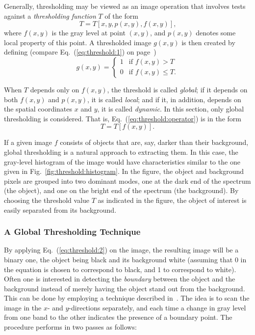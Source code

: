 Generally, thresholding may be viewed as an image operation that
involves tests against a {\em thresholding function\/} $T$ of the form
\begin{equation}
\label{eq:threshold:operator}
  T=T[x,y,p(x,y),f(x,y)]\mbox{,}
\end{equation}
where $f(x,y)$ is the gray level at point $(x,y)$, and $p(x,y)$
denotes some local property of this point.  A thresholded image
$g(x,y)$ is then created by defining (compare
Eq.~(\ref{eq:threshold:1}) on page~\pageref{eq:threshold:1})
\begin{equation}
\label{eq:threshold:2}
  g(x,y)=\left\{
    \begin{array}{ll}
      1 & \mbox{if $f(x,y)>T$} \\
      0 & \mbox{if $f(x,y)\leq T$.}
    \end{array}\right.
\end{equation}

When $T$ depends only on $f(x,y)$, the threshold is called {\em
  global\/}; if it depends on both $f(x,y)$ and $p(x,y)$, it is called
{\em local\/}; and if it, in addition, depends on the spatial
coordinates $x$ and $y$, it is called {\em dynamic\/}.  In this
section, only global thresholding is considered.  That is,
Eq.~(\ref{eq:threshold:operator}) is in the form
\begin{equation}
  T=T[f(x,y)]\mbox{.}
\end{equation}

If a given image $f$ consists of objects that are, say, darker than
their background, global thresholding is a natural approach to
extracting them.  In this case, the gray-level histogram of the image
would have characteristics similar to the one given in
Fig.~\ref{fig:threshold:histogram}.  In the figure, the object and
background pixels are grouped into two dominant modes, one at the dark
end of the spectrum (the object), and one on the bright end of the
spectrum (the background).
By choosing the threshold value $T$ as indicated in the figure, the
object of interest is easily separated from its background.

\subsubsection{A Global Thresholding Technique}

By applying Eq.~(\ref{eq:threshold:2}) on the image, the resulting
image will be a binary one, the object being black and its background
white (assuming that 0 in the equation is chosen to correspond to
black, and 1 to correspond to white).  Often one is interested in
detecting the {\em boundary\/} between the object and the background
instead of merely having the object stand out from the background.
This can be done by employing a technique described in~\cite{digim}.
The idea is to scan the image in the $x$- and $y$-directions
separately, and each time a change in gray level from one band to the
other indicates the presence of a boundary point.  The procedure
performs in two passes as follows:


